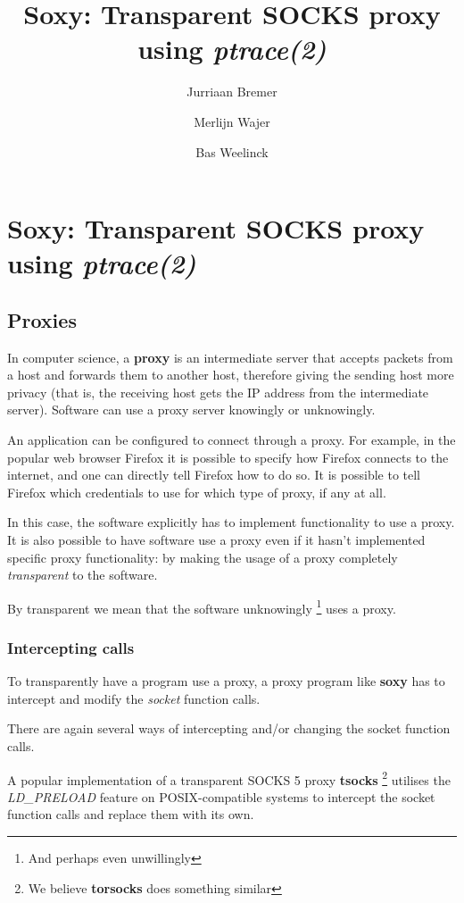 \documentclass[a4paper]{article}
\author{Jurriaan Bremer \and Merlijn Wajer \and Bas Weelinck}
\title{Soxy: Transparent SOCKS proxy using \textit{ptrace(2)}}
\begin{document}
\maketitle

\section{Soxy: Transparent SOCKS proxy using \textit{ptrace(2)}}

\subsection{Proxies}
In computer science, a \textbf{proxy} is an intermediate server that
accepts packets from a host and forwards them to another host,
therefore giving the sending host more privacy (that is, the
receiving host gets the IP address from the intermediate server).
Software can use a proxy server knowingly or unknowingly.

An application can be configured to connect through a proxy. For example, in
the popular web browser Firefox it is possible to specify how Firefox connects
to the internet, and one can directly tell Firefox how to do so.
It is possible to tell Firefox which credentials to use for which type of proxy,
if any at all.

In this case, the software explicitly has to implement functionality to use a
proxy. It is also possible to have software use a proxy even if it hasn't
implemented specific proxy functionality: by making the usage of a proxy
completely \textit{transparent} to the software.

By transparent we mean that the software unknowingly
\footnote{And perhaps even unwillingly} uses a proxy.

\subsubsection{Intercepting calls}

To transparently have a program use a proxy, a proxy program like \textbf{soxy}
has to intercept and modify the \textit{socket} function calls.

There are again several ways of intercepting and/or changing the socket function
calls.

A popular implementation of a transparent SOCKS 5 proxy \textbf{tsocks}
\footnote{We believe \textbf{torsocks} does something similar}
utilises the \textit{LD\_PRELOAD} feature on POSIX-compatible systems to
intercept the socket function calls and replace them with its own.
\end{document}
